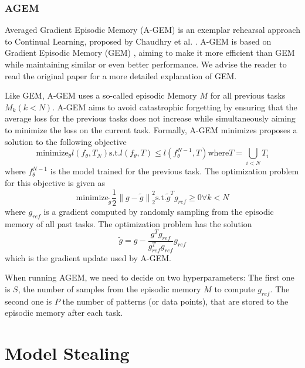 \subsubsection{AGEM}
Averaged Gradient Episodic Memory (A-GEM) is an exemplar rehearsal approach to Continual Learning, proposed by Chaudhry et al. \cite{chaudhry2018efficient}.
A-GEM is based on Gradient Episodic Memory (GEM) \cite{lopez2017gradient}, aiming to make it more efficient than GEM while maintaining similar or even better
performance. We advise the reader to read the original paper for a more detailed explanation of GEM. \par
Like GEM, A-GEM uses a so-called episodic Memory $M$ for all previous tasks $M_k (k<N)$. A-GEM aims to avoid catastrophic forgetting by ensuring that the average loss for
the previous tasks does not increase while simultaneously aiming to minimize the loss on the current task. Formally, A-GEM minimizes proposes a solution to the following 
objective 
\begin{equation}
    \text{minimize}_\theta l(f_\theta,T_N) \text{s.t.} l(f_\theta,T) \leq l(f_\theta^{N-1},T) \text{where} T = \bigcup_{i<N} T_i
\end{equation}
where $f_\theta^{N-1}$ is the model trained for the previous task. The optimization problem for this objective is given as
\begin{equation}
    \text{minimize}_{\tilde{g}} \frac{1}{2} {\lVert g - \tilde{g} \rVert}^2_2 \text{s.t.} \tilde{g}^T g_{ref} \geq 0 \forall k < N
\end{equation}
where $g_{ref}$ is a gradient computed by randomly sampling from the episodic memory of all past tasks. The optimization problem has the solution 
\begin{equation}
    \tilde{g} = g - \frac{g^T g_{ref}}{g^T_{ref} g_{ref}} g_{ref}
\end{equation}
which is the gradient update used by A-GEM. \par
When running AGEM, we need to decide on two hyperparameters: The first one is $S$, the number of samples from the episodic memory $M$ to compute $g_{ref}$. The second
one is $P$ the number of patterns (or data points), that are stored to the episodic memory after each task.


\section{Model Stealing}
\label{sec:Related_work:Model_Stealing}

